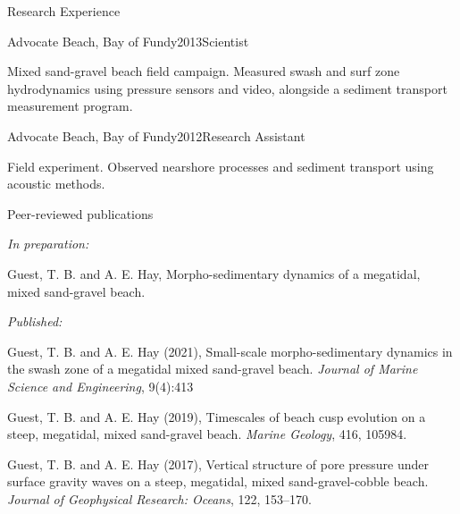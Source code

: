 \documentclass{resume} %
\begin{document}
\begin{rSection}{Research Experience}
	\begin{rSubsection}{Advocate Beach, Bay of Fundy}{2013}{Scientist}{}
		\item Mixed sand-gravel beach field campaign. Measured swash and surf zone hydrodynamics using pressure sensors and video, alongside a sediment transport measurement program.
	\end{rSubsection}
	
	\begin{rSubsection}{Advocate Beach, Bay of Fundy}{2012}{Research Assistant}{}
		\item Field experiment. Observed nearshore processes and sediment transport using acoustic methods.
	\end{rSubsection}

\end{rSection}


\begin{rSection}{Peer-reviewed publications}
	
	{\em In preparation:}
	
	Guest, T. B. and A. E. Hay, Morpho-sedimentary dynamics of a megatidal, mixed sand-gravel beach.
	
	{\em Published:}
	
	Guest, T. B. and A. E. Hay (2021), Small-scale morpho-sedimentary dynamics in the swash zone of a megatidal mixed sand-gravel beach. \textit{Journal of Marine Science and Engineering}, 9(4):413
	
	Guest, T. B. and A. E. Hay (2019), Timescales of beach cusp evolution on a steep, megatidal, mixed sand-gravel beach. \textit{Marine Geology}, 416, 105984.
	
	Guest, T. B. and A. E. Hay (2017), Vertical structure of pore pressure under surface gravity waves on a steep, megatidal, mixed sand-gravel-cobble beach. \textit{Journal of Geophysical Research: Oceans}, 122, 153–170.
	
\end{rSection}
\end{document}

